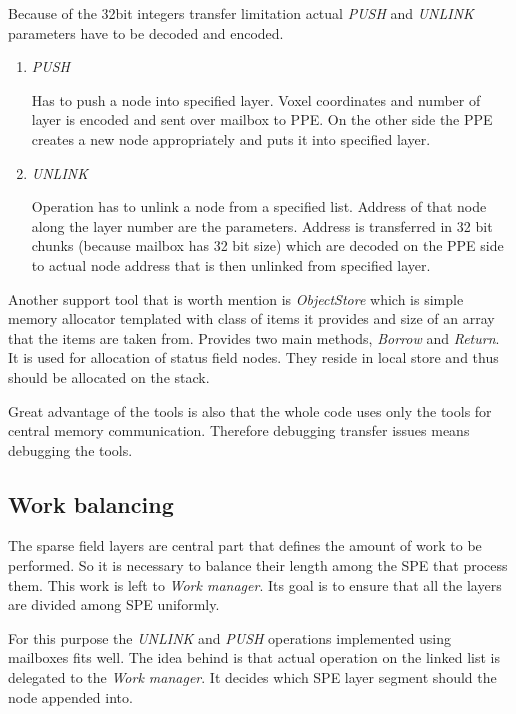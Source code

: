 \par
Because of the 32bit integers transfer limitation actual \emph{PUSH} and \emph{UNLINK} parameters have to be decoded and encoded.

\begin{enumerate}
\item \emph{PUSH}
\par
Has to push a node into specified layer.
Voxel coordinates and number of layer is encoded and sent over mailbox to PPE.
On the other side the PPE creates a new node appropriately and puts it into specified layer.

\item \emph{UNLINK}
\par
Operation has to unlink a node from a specified list.
Address of that node along the layer number are the parameters.
Address is transferred in 32 bit chunks (because mailbox has 32 bit size) which are decoded on the PPE side to actual node address that is then unlinked from specified layer.
\end{enumerate}

\par
Another support tool that is worth mention is \emph{ObjectStore} which is simple memory allocator templated with class of items it provides and size of an array that the items are taken from.
Provides two main methods, \emph{Borrow} and \emph{Return}.
It is used for allocation of status field nodes.
They reside in local store and thus should be allocated on the stack.

\par
Great advantage of the tools is also that the whole code uses only the tools for central memory communication.
Therefore debugging transfer issues means debugging the tools.

\subsection{Work balancing}

\par
The sparse field layers are central part that defines the amount of work to be performed.
So it is necessary to balance their length among the SPE that process them.
This work is left to \emph{Work manager}.
Its goal is to ensure that all the layers are divided among SPE uniformly.

\par
For this purpose the \emph{UNLINK} and \emph{PUSH} operations implemented using mailboxes fits well.
The idea behind is that actual operation on the linked list is delegated to the \emph{Work manager}.
It decides which SPE layer segment should the node appended into.

